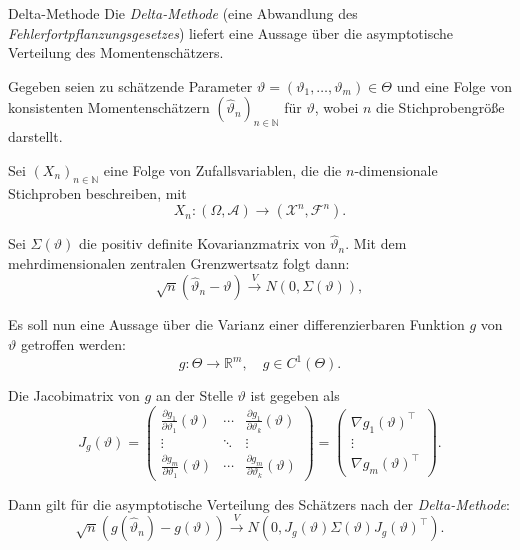 \begin{defi}{Delta-Methode}
    Die \emph{Delta-Methode} (eine Abwandlung des \emph{Fehlerfortpflanzungsgesetzes}) liefert eine Aussage über die asymptotische Verteilung des Momentenschätzers.

    Gegeben seien zu schätzende Parameter $\vartheta = (\vartheta_1, \dotsc, \vartheta_m) \in \Theta$ und eine Folge von konsistenten Momentenschätzern $(\hat{\vartheta}_n)_{n \in \mathbb{N}}$ für $\vartheta$, wobei $n$ die Stichprobengröße darstellt.

    Sei $(X_n)_{n \in \mathbb{N}}$ eine Folge von Zufallsvariablen, die die $n$-dimensionale Stichproben beschreiben, mit
    \[
        X_n: (\Omega, \mathcal{A}) \to (\mathcal{X}^n, \mathcal{F}^n).
    \]

    Sei $\Sigma(\vartheta)$ die positiv definite Kovarianzmatrix von $\hat{\vartheta}_n$.
    Mit dem mehrdimensionalen zentralen Grenzwertsatz folgt dann:
    \[
        \sqrt{n} \left( \hat{\vartheta}_n - \vartheta \right) \xrightarrow{V} N(0, \Sigma(\vartheta)),
    \]

    Es soll nun eine Aussage über die Varianz einer differenzierbaren Funktion $g$ von $\vartheta$ getroffen werden:
    \[
        g: \Theta \to \mathbb{R}^m, \quad g \in C^1(\Theta).
    \]

    Die Jacobimatrix von $g$ an der Stelle $\vartheta$ ist gegeben als
    \[
        J_g(\vartheta) = \begin{pmatrix}
            \frac{\partial g_1}{\partial \vartheta_1}(\vartheta) & \cdots & \frac{\partial g_1}{\partial \vartheta_k}(\vartheta) \\
            \vdots                                               & \ddots & \vdots                                               \\
            \frac{\partial g_m}{\partial \vartheta_1}(\vartheta) & \cdots & \frac{\partial g_m}{\partial \vartheta_k}(\vartheta)
        \end{pmatrix} = \begin{pmatrix}
            \nabla g_1(\vartheta)^\top \\
            \vdots                     \\
            \nabla g_m(\vartheta)^\top
        \end{pmatrix}.
    \]

    Dann gilt für die asymptotische Verteilung des Schätzers nach der \emph{Delta-Methode}:
    \[
        \sqrt{n} \left( g(\hat{\vartheta}_n) - g(\vartheta) \right) \xrightarrow{V} N(0, J_g(\vartheta) \Sigma(\vartheta) J_g(\vartheta)^\top).
    \]
\end{defi}

